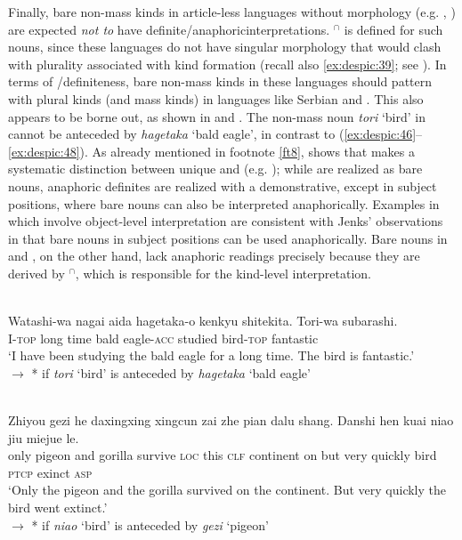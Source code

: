 \documentclass[output=paper,
modfonts
]{langscibook}
\begin{document}
	Finally, bare non-mass kinds in article-less languages without  morphology (e.g. , ) are expected \textit{not to} have definite/anaphoric\linebreak\noindent interpretations. $^\cap$ is defined for such nouns, since these languages do not have singular morphology that would clash with plurality associated with kind formation (recall also \ref{ex:despic:39}; see \citealt[411-413]{Dayal2004}). In terms of /definiteness, bare non-mass kinds in these languages should pattern with plural kinds (and mass kinds) in languages like Serbian and . This also appears to be borne out, as shown in  and . The non-mass noun \textit{tori} `bird' in  cannot be anteceded by \textit{hagetaka} `bald eagle', in contrast to (\ref{ex:despic:46}--\ref{ex:despic:48}).
	As already mentioned in footnote \ref{ft8}, \citet{Jenkstoappear} shows that  makes a systematic distinction between unique and  (e.g. \citealt{Schwarz2009}); while  are realized as bare nouns, anaphoric definites are realized with a demonstrative, except in subject positions, where bare nouns can also be interpreted anaphorically. Examples in  which involve object-level interpretation are consistent with Jenks' observations in that bare nouns in subject positions can be used anaphorically. Bare nouns in  and , on the other hand, lack anaphoric readings precisely because they are derived by $^\cap$, which is responsible for the kind-level interpretation.\pagebreak
	
	\ea \label{ex:despic:52} 
	 \\
	\gll 
	{Watashi}-{wa} {nagai} {aida} {hagetaka-o} {kenkyu shitekita}. {Tori}-{wa} {subarashi}. \\
	I-\textsc{top} long time {bald eagle-\textsc{acc}} studied bird-\textsc{top} fantastic \\ 
	\glt `I have been studying the bald eagle for a long time. The bird is fantastic.' \\
	$\rightarrow$ * if \textit{tori} `bird' is anteceded by \textit{hagetaka} `bald eagle'
	\z 
	
	\ea \label{ex:despic:53}
	 \\
	\gll 
	{Zhiyou} {gezi} {he} {daxingxing} {xingcun} {zai} {zhe} {pian} {dalu} {shang}. {Danshi} {hen} {kuai} {niao} {jiu} {miejue} {le.} \\
	only pigeon and gorilla survive \textsc{loc} this \textsc{clf} continent on but very quickly bird \textsc{ptcp} exinct \textsc{asp} \\
	\glt `Only the pigeon and the gorilla survived on the continent. But very quickly the bird went extinct.' \\
	$\rightarrow$ * if \textit{niao} `bird' is anteceded by \textit{gezi} `pigeon'
	\z 
	
\end{document}

